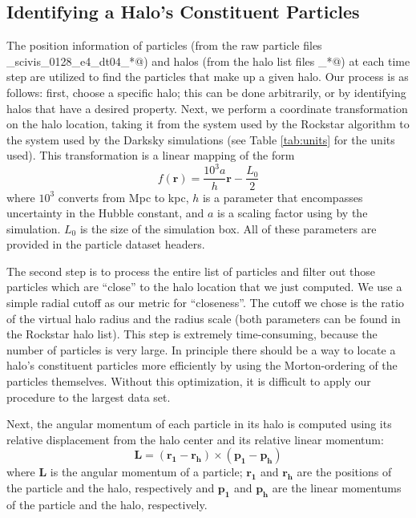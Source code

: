 \documentclass[12pt]{article}
\renewcommand{\vec}[1]{\mathbf{#1}}
\begin{document}
\subsection{Identifying a Halo's Constituent Particles}
The position information of particles (from the raw particle files
_scivis_0128_e4_dt04_*@) and halos (from the halo list files
\verb@hlist_*@) at each time step are utilized to find the particles that make
up a given halo. Our process is as follows: first, choose a specific halo; this
can be done arbitrarily, or by identifying halos that have a desired property.
Next, we perform a coordinate transformation on the halo location, taking it
from the system used by the Rockstar algorithm to the system used by the
Darksky simulations (see Table \ref{tab:units} for the units used). This
transformation is a linear mapping of the form
\begin{equation}
f(\vec{r}) = \frac{10^3 a}{h} \vec{r} - \frac{L_0}{2}
\end{equation}
where $10^{3}$ converts from Mpc to kpc, $h$ is a parameter that encompasses
uncertainty in the Hubble constant, and $a$ is a scaling factor using by the
simulation. $L_0$ is the size of the simulation box. All of these parameters are
provided in the particle dataset headers.

The second step is to process the entire list of particles and filter out those
particles which are ``close'' to the halo location that we just computed.  We
use a simple radial cutoff as our metric for ``closeness''. The cutoff we chose
is the ratio of the virtual halo radius and the radius scale (both parameters
can be found in the Rockstar halo list). This step is extremely time-consuming,
because the number of particles is very large.  In principle there should be
a way to locate a halo's constituent particles more efficiently by using the
Morton-ordering of the particles themselves. Without this optimization, it is
difficult to apply our procedure to the largest data set.

Next, the angular momentum of each particle in its halo is computed using
its relative displacement from the halo center and its relative linear
momentum:
\begin{equation}
\vec{L} = (\vec{r_1} - \vec{r_h}) \times (\vec{p_1} - \vec{p_h})
\end{equation}
where $\vec{L}$ is the angular momentum of a particle; $\vec{r_1}$ and $\vec{r_h}$ are
the positions of the particle and the halo, respectively and $\vec{p_1}$ and $\vec{p_h}$ 
are the linear momentums of the particle and the halo, respectively.
\end{document}
